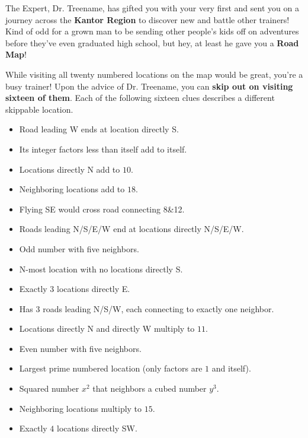 

The \mappMobimon{} Expert, Dr. Treename, has gifted you with your very
first \mappMobimon{} and sent you on a journey across the
\textbf{Kantor Region} to discover new \mappMobimon{} and battle other
trainers! Kind of odd for a grown man to be sending other people's kids off
on adventures before they've even graduated high school, but hey, at least he
gave you a \textbf{Road Map}!

While visiting all twenty numbered locations on the map would be great, you're a
busy trainer! Upon the advice of Dr. Treename, you can
\textbf{skip out on visiting sixteen of them}.
Each of the following sixteen clues describes a different skippable location.

\begin{multicols}{2}
  \begin{itemize}
    \item Road leading W ends at location directly S. %
    \item Its integer factors less than itself add to itself. %
    \item Locations directly N add to \(10\). %
    \item Neighboring locations add to \(18\). %
    \item Flying SE would cross road connecting 8\&12. %
    \item Roads leading N/S/E/W end at locations directly N/S/E/W. %
    \item Odd number with five neighbors. %
    \item N-most location with no locations directly S. %
    \item Exactly \(3\) locations directly E. %
    \item Has \(3\) roads leading N/S/W, each connecting to exactly one neighbor. %
    \item Locations directly N and directly W multiply to \(11\). %
    \item Even number with five neighbors. %
    \item Largest prime numbered location (only factors are \(1\) and itself). %
    \item Squared number \(x^2\) that neighbors a cubed number \(y^3\). %
    \item Neighboring locations multiply to \(15\). %
    \item Exactly \(4\) locations directly SW. %
  \end{itemize}
\end{multicols}

